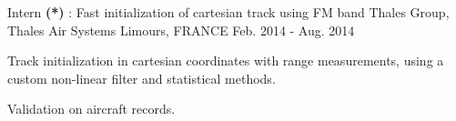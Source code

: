\begin{cventries}

\cventry
{Intern \textbf{(*)} : Fast initialization of cartesian track using FM band} %
{Thales Group, Thales Air Systems} %
{Limours, FRANCE} %
{Feb. 2014 - Aug. 2014} %
{ %
\begin{cvitems}
\item {Track initialization in cartesian coordinates with range measurements, using a custom non-linear filter and statistical methods.}
\item {Validation on aircraft records.}
\end{cvitems}
}
\vspace{10mm}
\end{cventries}
